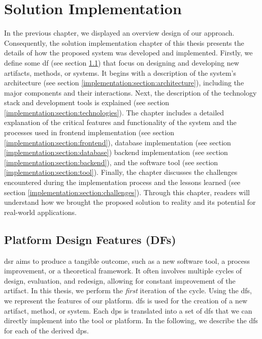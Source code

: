 
\chapter{Solution Implementation}

\ifpdf
    \graphicspath{{Chapters/Implementation/Figs/}{Chapters/Implementation/Figs/}{Chapters/Implementation/Figs/}}
\else
    \graphicspath{{Chapters/Implementation/Figs/}{Chapters/Implementation/Figs/}}
\fi
In the previous chapter, we displayed an overview design of our approach.
Consequently, the solution implementation chapter of this thesis presents the details of how the proposed system was developed and implemented.
Firstly, we define some \ac{df} (see section \ref{implementation:section:designfeatures}) that focus on designing and developing new artifacts, methods, or systems.
It begins with a description of the system's architecture (see section \ref{implementation:section:architecture}), including the major components and their interactions.
Next, the description of the technology stack and development tools is explained (see section \ref{implementation:section:technologies}).
The chapter includes a detailed explanation of the critical features and functionality of the system and the processes used in frontend implementation (see section \ref{implementation:section:frontend}), database implementation (see section \ref{implementation:section:database}) backend implementation (see section \ref{implementation:section:backend}), and the software tool (see section \ref{implementation:section:tool}). 
Finally, the chapter discusses the challenges encountered during the implementation process and the lessons learned (see section \ref{implementation:section:challenges}). 
Through this chapter, readers will understand how we brought the proposed solution to reality and its potential for real-world applications.

\section{Platform Design Features (DFs)}
\label{implementation:section:designfeatures}
\ac{dsr} aims to produce a tangible outcome, such as a new software tool, a process improvement, or a theoretical framework.
It often involves multiple cycles of design, evaluation, and redesign, allowing for constant improvement of the artifact.
In this thesis, we perform the \textit{first} iteration of the cycle.
Using the \ac{df}s, we represent the features of our platform. 
\ac{df}s is used for the creation of a new artifact, method, or system.
Each \ac{dp}s is translated into a set of \ac{df}s that we can directly implement into the tool or platform.
In the following, we describe the \ac{df}s for each of the derived \ac{dp}s.

